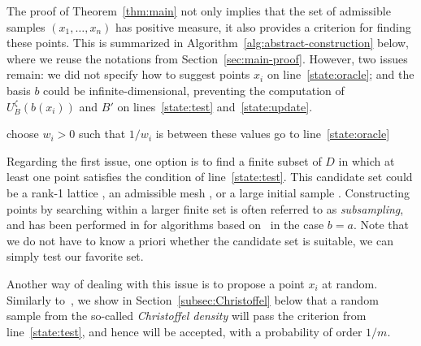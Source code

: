 \documentclass[a4paper,11pt]{article}
\renewcommand{\(}{\left (}
\renewcommand{\)}{\right )}
\newcommand{\<}{\langle}
\renewcommand{\>}{\rangle}
\theoremstyle{definition}
\begin{document}
The proof of Theorem~\ref{thm:main} not only implies that the set of admissible samples $(x_1,\dots,x_n)$ has positive measure, it also provides a criterion for finding these points. This is summarized in Algorithm~\ref{alg:abstract-construction} below, where we reuse the notations from Section~\ref{sec:main-proof}. However, two issues remain:
we did not specify how to suggest points $x_i$ on line~\ref{state:oracle};
and the basis $b$ could be infinite-dimensional, preventing the computation of $U_B^\zeta(b(x_i))$ and $B'$ on lines~\ref{state:test} and~\ref{state:update}.

\begin{algorithm}
\begin{algorithmic}[1]
\smallskip

\smallskip
{}
\smallskip
{}
\STATE choose $w_i>0$ such that $1/w_i$ is between these values \label{state:choose-w}
\ELSE 
\STATE go to line~\ref{state:oracle}
\ENDIF
{}
\ENDFOR
{}
\end{algorithmic}
\caption{Construction of the points and weights from Theorem~\ref{thm:main}}
\label{alg:abstract-construction}
\end{algorithm}

Regarding the first issue, one option is to find a finite subset of $D$ in which at least one point satisfies the condition of line~\ref{state:test}.
This 
candidate set
could be a rank-1 lattice \cite{BKPU}, an admissible mesh \cite{BPV}, or a large initial sample \cite{CDdomains}.
Constructing points by searching within a larger
finite set is often referred to as \emph{subsampling},
and has been performed in \cite{BKPU,BSU}
for algorithms based on~\cite{BSS} in the case $b=a$.
Note that we do not have to know a priori whether the candidate set is suitable, we can simply test our favorite set.

Another way of dealing with this issue is to propose a point $x_i$ at random.
Similarly to~\cite{ChkifaDolbeault24}, 
we show in Section~\ref{subsec:Christoffel} below that a random sample from the so-called \emph{Christoffel density}
will pass the criterion from line~\ref{state:test}, and hence will be accepted, with a probability of order $1/m$.
\end{document}
